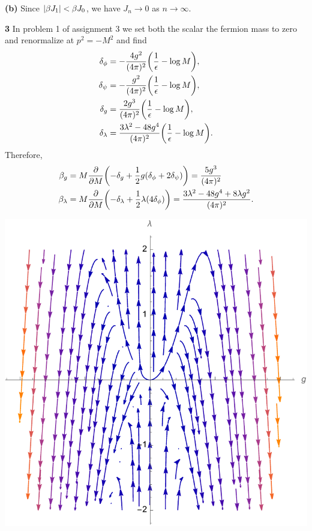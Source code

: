 \documentclass{article}
\makeatletter
\newcommand*{\shifttext}[1]{%
  \settowidth{\@tempdima}{#1}%
  \hspace{-\@tempdima}#1%
}
\newcommand{\plabel}[1]{%
\shifttext{\textbf{#1}\quad}%
}
\newcommand{\prule}{%
\begin{center}%
\hdashrule[0.5ex]{.99\linewidth}{1pt}{1pt 2.5pt}%
\end{center}%
}
\makeatother
\begin{document}
\plabel{(b)}%
Since $\abs{\beta J_1} < \beta J_0$, we have $J_n \rightarrow 0$ as $n\rightarrow \infty$.
\begin{center}
\end{center}

\prule

\plabel{3}%
In problem 1 of assignment 3 we set both the scalar the fermion mass to zero and renormalize at $p^2 = -M^2$ and find
\begin{align*}
    \delta_{\phi} &= -\frac{4g^2}{(4\pi)^2}\qty(\frac{1}{\epsilon} - \log M), \\
    \delta_\psi &= -\frac{g^2}{(4\pi)^2}\qty(\frac{1}{\epsilon} - \log M), \\
    \delta_g &= \frac{2g^3}{(4\pi)^2}\qty(\frac{1}{\epsilon} - \log M), \\
    \delta_\lambda &= \frac{3\lambda^2 - 48g^4}{(4\pi)^2}\qty(\frac{1}{\epsilon} - \log M).
\end{align*}
Therefore,
\begin{align*}
    \beta_g &= M\pdv{M}\qty(-\delta_g + \frac{1}{2}g \qty(\delta_\phi + 2\delta_\psi)) = \frac{5g^3}{(4\pi)^2} \\
    \beta_\lambda &= M\pdv{M}\qty(-\delta_\lambda + \frac{1}{2}\lambda \qty(4\delta_\phi)) = \frac{3\lambda^2 - 48g^4 + 8\lambda g^2}{(4\pi)^2}.
\end{align*}
\begin{center}
    \includegraphics[width=.5\linewidth]{img/HW4.3.pdf}
\end{center}
\end{document}

